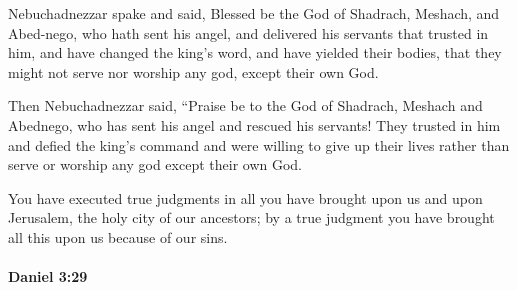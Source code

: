 			\begin{versebox}
					\item[BHS] 
					\item[LXX] 
					\item[ASV] Nebuchadnezzar spake and said, Blessed be the God of Shadrach, Meshach, and Abed-nego, who hath sent his angel, and delivered his servants that trusted in him, and have changed the king's word, and have yielded their bodies, that they might not serve nor worship any god, except their own God.
					\item[NIV] Then Nebuchadnezzar said, “Praise be to the God of Shadrach, Meshach and Abednego, who has sent his angel and rescued his servants! They trusted in him and defied the king’s command and were willing to give up their lives rather than serve or worship any god except their own God.
					\item[NRSV] You have executed true judgments in all you have brought upon us and upon Jerusalem, the holy city of our ancestors; by a true judgment you have brought all this upon us because of our sins.
			\end{versebox}

		\paragraph{Daniel 3:29} %
			\label{DANIEL-3-29}

